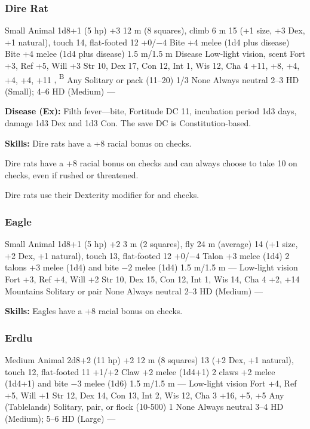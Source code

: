 \vskip3cm
\subsubsection{Dire Rat}
\begin{MonsterStats}
{Small Animal}
{1d8+1 (5 hp)}
{+3}
{12 m (8 squares), climb 6 m}
{15 (+1 size, +3 Dex, +1 natural), touch 14, flat-footed 12}
{+0/$-4$}
{Bite +4 melee (1d4 plus disease)}
{Bite +4 melee (1d4 plus disease)}
{1.5 m/1.5 m}
{Disease}
{Low-light vision, scent}
{Fort +3, Ref +5, Will +3}
{Str 10, Dex 17, Con 12, Int 1, Wis 12, Cha 4}
{ +11,  +8,  +4,  +4,  +4,  +11}
{, \textsuperscript{B}}
{Any}
{Solitary or pack (11--20)}
{1/3}
{None}
{Always neutral}
{2--3 HD (Small); 4--6 HD (Medium)}
{---}
\end{MonsterStats}

\textbf{Disease (Ex):} Filth fever---bite, Fortitude DC 11, incubation period 1d3 days, damage 1d3 Dex and 1d3 Con. The save DC is Constitution-based.

\textbf{Skills:} Dire rats have a +8 racial bonus on  checks.

Dire rats have a +8 racial bonus on  checks and can always choose to take 10 on  checks, even if rushed or threatened.

Dire rats use their Dexterity modifier for  and  checks.

\subsubsection{Eagle}
\begin{MonsterStats}
{Small Animal}
{1d8+1 (5 hp)}
{+2}
{3 m (2 squares), fly 24 m (average)}
{14 (+1 size, +2 Dex, +1 natural), touch 13, flat-footed 12}
{+0/$-4$}
{Talon +3 melee (1d4)}
{2 talons +3 melee (1d4) and bite $-2$ melee (1d4)}
{1.5 m/1.5 m}
{---}
{Low-light vision}
{Fort +3, Ref +4, Will +2}
{Str 10, Dex 15, Con 12, Int 1, Wis 14, Cha 4}
{ +2,  +14}
{}
{Mountains}
{Solitary or pair}
{\onehalf}
{None}
{Always neutral}
{2--3 HD (Medium)}
{---}
\end{MonsterStats}

\textbf{Skills:} Eagles have a +8 racial bonus on  checks.

\subsubsection{Erdlu}
\begin{MonsterStats}
{Medium Animal}
{2d8+2 (11 hp)}
{+2}
{12 m (8 squares)}
{13 (+2 Dex, +1 natural), touch 12, flat-footed 11}
{+1/+2}
{Claw +2 melee (1d4+1)}
{2 claws +2 melee (1d4+1) and bite $-3$ melee (1d6)}
{1.5 m/1.5 m}
{---}
{Low-light vision}
{Fort +4, Ref +5, Will +1}
{Str 12, Dex 14, Con 13, Int 2, Wis 12, Cha 3}
{ +16,  +5,  +5}
{}
{Any (Tablelands)}
{Solitary, pair, or flock (10-500)}
{1}
{None}
{Always neutral}
{3--4 HD (Medium); 5--6 HD (Large)}
{---}
\end{MonsterStats}

